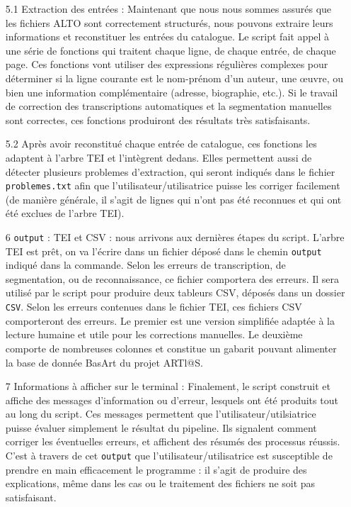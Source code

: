 \documentclass[a4paper,12pt,twoside]{book}
\begin{document}
\begin{itemize}
\item [5.1] Extraction des entrées : Maintenant que nous nous sommes assurés que les fichiers ALTO sont correctement structurés, nous pouvons extraire leurs informations et reconstituer les entrées du catalogue. Le script fait appel à une série de fonctions qui traitent chaque ligne, de chaque entrée, de chaque page. Ces fonctions vont utiliser des expressions régulières complexes pour déterminer si la ligne courante est le nom-prénom d'un auteur, une œuvre, ou bien une information complémentaire (adresse, biographie, etc.). Si le travail de correction des transcriptions automatiques et la segmentation manuelles sont correctes, ces fonctions produiront des résultats très satisfaisants. 
\item [5.2] Après avoir reconstitué chaque entrée de catalogue, ces fonctions les adaptent à l'arbre TEI et l'intègrent dedans. Elles permettent aussi de détecter plusieurs problemes d'extraction, qui seront indiqués dans le fichier \texttt{problemes.txt} afin que l'utilisateur/utilisatrice puisse les corriger facilement (de manière générale, il s'agit de lignes qui n'ont pas été reconnues et qui ont été exclues de l'arbre TEI).\\	

\item [6] \texttt{output} : TEI et CSV : nous arrivons aux dernières étapes du script. L'arbre TEI est prêt, on va l'écrire dans un fichier déposé dans le chemin \texttt{output} indiqué dans la commande. Selon les erreurs de transcription, de segmentation, ou de reconnaissance, ce fichier comportera des erreurs. Il sera utilisé par le script pour produire deux tableurs CSV, déposés dans un dossier \texttt{CSV}. Selon les erreurs contenues dans le fichier TEI, ces fichiers CSV comporteront des erreurs. Le premier est une version simplifiée adaptée à la lecture humaine et utile pour les corrections manuelles. Le deuxième comporte de nombreuses colonnes et constitue un gabarit pouvant alimenter la base de donnée BasArt du projet ARTl@S.\\

\item [7] Informations à afficher sur le terminal : Finalement, le script construit et affiche des messages d'information ou d'erreur, lesquels ont été produits tout au long du script. Ces messages permettent que l'utilisateur/utilsiatrice puisse évaluer simplement le résultat du pipeline. Ils signalent comment corriger les éventuelles erreurs, et affichent des résumés des processus réussis. C'est à travers de cet \texttt{output} que l'utilisateur/utilisatrice est susceptible de prendre en main efficacement le programme : il s'agit de produire des explications, même dans les cas ou le traitement des fichiers ne soit pas satisfaisant.
\end{itemize}
\end{document}
